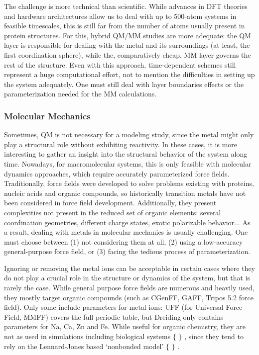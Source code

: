The challenge is more technical than scientific. While advances in DFT theories and hardware architectures allow us to deal with up to 500-atom systems in feasible timescales, this is still far from the number of atoms usually present in protein structures. For this, hybrid QM/MM studies are more adequate: the QM layer is responsible for dealing with the metal and its surroundings (at least, the first coordination sphere), while the, comparatively cheap, MM layer governs the rest of the structure. Even with this approach, time-dependent schemes still represent a huge computational effort, not to mention the difficulties in setting up the system adequately. One must still deal with layer boundaries effects or the parameterization needed for the MM calculations.

\subsubsection{Molecular Mechanics}
Sometimes, QM is not necessary for a modeling study, since the metal might only play a structural role without exhibiting reactivity. In these cases, it is more interesting to gather an insight into the structural behavior of the system along time. Nowadays, for macromolecular systems, this is only feasible with molecular dynamics approaches, which require accurately parameterized force fields. Traditionally, force fields were developed to solve problems existing with proteins, nucleic acids and organic compounds,\cite{lifson1968consistent,allinger1973,momany1975energy} so historically transition metals have not been considered in force field development. Additionally, they present complexities not present in the reduced set of organic elements: several coordination geometries, different charge states, exotic polarizable behavior... As a result, dealing with metals in molecular mechanics is usually challenging. One must choose between (1) not considering them at all, (2) using a low-accuracy general-purpose force field, or (3) facing the tedious process of parameterization.

Ignoring or removing the metal ions can be acceptable in certain cases where they do not play a crucial role in the structure or dynamics of the system, but that is rarely the case. While general purpose force fields are numerous and heavily used, they mostly target organic compounds (such as CGenFF,\cite{Vanommeslaeghe2009} GAFF,\cite{Wang2004} Tripos 5.2 force field\cite{clark1989}). Only some include parameters for metal ions: UFF (for Universal Force Field,\cite{rappe1992} MMFF\cite{halgren1996}) covers the full periodic table, but Dreiding\cite{Mayo1990} only contains parameters for Na, Ca, Zn and Fe. While useful for organic chemistry, they are not as used in simulations including biological systems $ \{ $ $ \} $ , since they tend to rely on the Lennard-Jones based ‘nonbonded model’ $ \{ $ $ \} $ .

